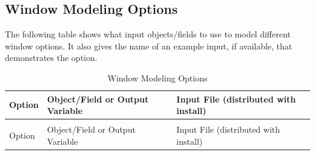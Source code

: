 \subsection{Window Modeling Options}\label{window-modeling-options}

The following table shows what input objects/fields to use to model different window options. It also gives the name of an example input, if available, that demonstrates the option.

\begin{longtable}[c]{p{2.0in}p{2.0in}p{2.0in}}
\caption{Window Modeling Options \label{table:window-modeling-options}} \tabularnewline
\toprule
Option & Object/Field or Output Variable & Input File (distributed with install) \tabularnewline
\midrule
\endfirsthead

\caption[]{Window Modeling Options} \tabularnewline
\toprule
Option & Object/Field or Output Variable & Input File (distributed with install) \tabularnewline
\midrule
\endhead


\end{longtable}
